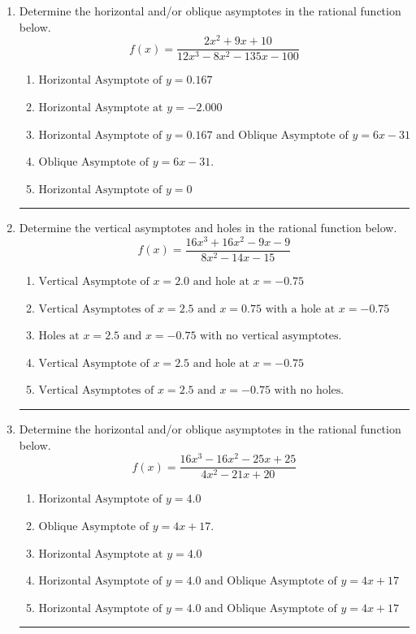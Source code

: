\documentclass[14pt]{extbook}
\newcommand{\litem}[1]{\item#1\hspace*{-1cm}\rule{\textwidth}{0.4pt}}
\begin{document}
\begin{enumerate}
{\begin{enumerate}[label=\Alph*.]
\end{enumerate} }
\litem{
Determine the horizontal and/or oblique asymptotes in the rational function below.\[ f(x) = \frac{2x^{2} +9 x + 10}{12x^{3} -8 x^{2} -135 x -100} \]\begin{enumerate}[label=\Alph*.]
\item \( \text{Horizontal Asymptote of } y = 0.167  \)
\item \( \text{Horizontal Asymptote at } y = -2.000 \)
\item \( \text{Horizontal Asymptote of } y = 0.167 \text{ and Oblique Asymptote of } y = 6x -31 \)
\item \( \text{Oblique Asymptote of } y = 6x -31. \)
\item \( \text{Horizontal Asymptote of } y = 0 \)

\end{enumerate} }
\litem{
Determine the vertical asymptotes and holes in the rational function below.\[ f(x) = \frac{16x^{3} +16 x^{2} -9 x -9}{8x^{2} -14 x -15} \]\begin{enumerate}[label=\Alph*.]
\item \( \text{Vertical Asymptote of } x = 2.0 \text{ and hole at } x = -0.75 \)
\item \( \text{Vertical Asymptotes of } x = 2.5 \text{ and } x = 0.75 \text{ with a hole at } x = -0.75 \)
\item \( \text{Holes at } x = 2.5 \text{ and } x = -0.75 \text{ with no vertical asymptotes.} \)
\item \( \text{Vertical Asymptote of } x = 2.5 \text{ and hole at } x = -0.75 \)
\item \( \text{Vertical Asymptotes of } x = 2.5 \text{ and } x = -0.75 \text{ with no holes.} \)

\end{enumerate} }
\litem{
Determine the horizontal and/or oblique asymptotes in the rational function below.\[ f(x) = \frac{16x^{3} -16 x^{2} -25 x + 25}{4x^{2} -21 x + 20} \]\begin{enumerate}[label=\Alph*.]
\item \( \text{Horizontal Asymptote of } y = 4.0  \)
\item \( \text{Oblique Asymptote of } y = 4x + 17. \)
\item \( \text{Horizontal Asymptote at } y = 4.0 \)
\item \( \text{Horizontal Asymptote of } y = 4.0 \text{ and Oblique Asymptote of } y = 4x + 17 \)
\item \( \text{Horizontal Asymptote of } y = 4.0 \text{ and Oblique Asymptote of } y = 4x + 17 \)


\end{enumerate}}
\end{enumerate}
\end{document}
